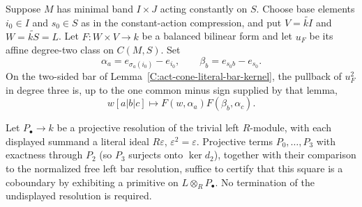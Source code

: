 \begin{proposition}
\label{C:act-projective-affine-square}
Suppose $M$ has minimal band $I\times J$ acting constantly on $S$.
Choose base elements $i_0\in I$ and $s_0\in S$ as in the
constant-action compression, and put
$V=\widetilde{kI}$ and $W=\widetilde{kS}=L$.
Let $F:W\times V\to k$ be a balanced bilinear form and let $u_F$
be its affine degree-two class on $C(M,S)$.
Set
\[
 \alpha_a=e_{\sigma_a(i_0)}-e_{i_0},\qquad
 \beta_b=e_{s_0b}-e_{s_0}.
\]
On the two-sided bar of Lemma~\ref{C:act-cone-literal-bar-kernel},
the pullback of $u_F^2$ in degree three is, up to the one common
minus sign supplied by that lemma,
\[
 w[a|b|c]\longmapsto F(w,\alpha_a)F(\beta_b,\alpha_c).
\]

Let $P_\bullet\to k$ be a projective resolution of the trivial
left $R$-module, with each displayed summand a literal ideal
$R\varepsilon$, $\varepsilon^2=\varepsilon$.
Projective terms $P_0,\ldots,P_3$ with exactness through $P_2$
(so $P_3$ surjects onto $\ker d_2$), together with their comparison
to the normalized free left bar resolution, suffice to certify that
this square is a coboundary by exhibiting a primitive on
$L\otimes_RP_\bullet$.
No termination of the undisplayed resolution is required.
\end{proposition}

